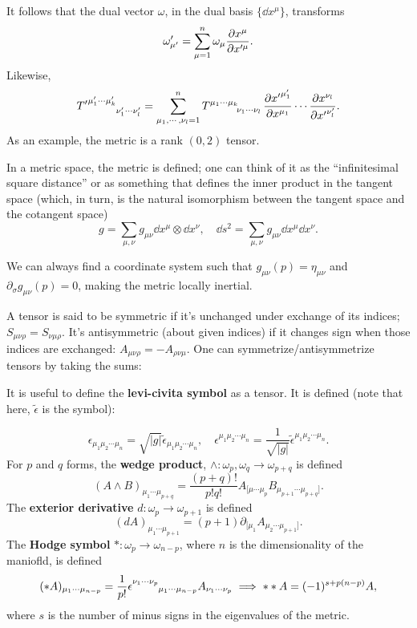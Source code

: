 \documentclass{article}
\begin{document}
It follows that the dual vector $\omega$, in the dual basis $\{\dd x^\mu\}$, transforms 
$$\omega'_{\mu'}=\sum^n_{\mu=1}\omega_\mu \frac{\partial x^\mu}{\partial x'^\mu}.$$
Likewise,
$${T'}\indices{^{\mu'_1\cdots\mu'_k}_{\nu'_1\cdots\nu'_l}}=\sum^n_{\mu_1,\cdots,\nu_l=1}T\indices{^{\mu_1\cdots\mu_k}_{\nu_1\cdots\nu_l}}\pde{{x'}^{\mu'_1}}{x^{\mu_1}}\cdots\pde{x^{\nu_l}}{{x'}^{\nu'_l}}.$$
As an example, the metric is a rank $(0,2)$ tensor. 


In a metric space, the metric is defined; one can think of it as the ``infinitesimal square distance'' or as something that defines the inner product in the tangent space (which, in turn, is the natural isomorphism between the tangent space and the cotangent space)
$$g=\sum_{\mu,\nu}g_{\mu\nu}\dd x^\mu\otimes\dd x^\nu,\quad\dd s^2=\sum_{\mu,\nu}g_{\mu\nu}\dd x^\mu\dd x^\nu.$$

We can always find a coordinate system such that $g_{\mu\nu}(p)=\eta_{\mu\nu}$ and $\partial_\sigma g_{\mu\nu}(p)=0$, making the metric locally inertial.

A tensor is said to be symmetric if it's unchanged under exchange of its indices; $S_{\mu\nu\rho}=S_{\nu\mu\rho}$. It's antisymmetric (about given indices) if it changes sign when those indices are exchanged: $A_{\mu\nu\rho}=-A_{\rho\nu\mu}$. One can symmetrize/antisymmetrize tensors by taking the sums:


It is useful to define the \textbf{levi-civita symbol} as a tensor. It is defined (note that here, $\tilde\epsilon$ is the symbol):

$$\epsilon_{\mu_1\mu_2\cdots\mu_n} = \sqrt{|g|} \tilde{\epsilon}_{\mu_1\mu_2\cdots\mu_n}, \quad \epsilon^{\mu_1\mu_2\cdots\mu_n} = \frac{1}{\sqrt{|g|}} \tilde{\epsilon}^{\mu_1 \mu_2 \cdots \mu_n}.$$
For $p$ and $q$ forms, the \textbf{wedge product}, $\wedge:\omega_p,\omega_q\to\omega_{p+q}$ is defined 
$$(A\wedge B)_{\mu_1\cdots\mu_{p+q}}=\frac{(p+q)!}{p!q!}A_{[\mu\cdots\mu_p}B_{\mu_{p+1}\cdots\mu_{p+q}]}.$$
The \textbf{exterior derivative} $d:\omega_p\to\omega_{p+1}$ is defined 
$$(dA)_{\mu_1\cdots\mu_{p+1}}=(p+1)\partial_{[\mu_1}A_{\mu_2\cdots\mu_{p+1}]}.$$
The \textbf{Hodge symbol} $*:\omega_p\to\omega_{n-p}$, where $n$ is the dimensionality of the maniofld, is defined 
$$(*A)_{\mu_1\cdots\mu_{n-p}}=\frac 1{p!}\epsilon\indices{^{\nu_1\cdots\nu_p}_{\mu_1\cdots\mu_{n-p}}}A_{\nu_1\cdots\nu_p}\implies **A=(-1)^{s+p(n-p)}A,$$
where $s$ is the number of minus signs in the eigenvalues of the metric.
\end{document}
